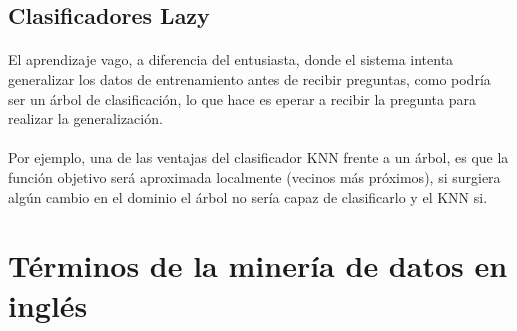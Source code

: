 \documentclass[es]{ifirak}
\begin{document}
\subsection{Clasificadores Lazy} 
\paragraph{}
El aprendizaje vago, a diferencia del entusiasta, donde el sistema intenta generalizar los datos de entrenamiento antes de recibir preguntas, como podría ser un árbol de clasificación, lo que hace es eperar a recibir la pregunta para realizar la generalización. 
\paragraph{}
Por ejemplo, una de las ventajas del clasificador KNN frente a un árbol, es que la función objetivo será aproximada localmente (vecinos más próximos), si surgiera algún cambio en el dominio el árbol no sería capaz de clasificarlo y el KNN si.

\section{Términos de la minería de datos en inglés }
\end{document}
